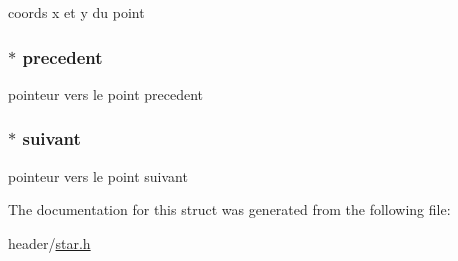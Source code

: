 coords x et y du point 

\hypertarget{struct_trajectoire_a3c1a423041539f8f86a4379cc76e00cb}{
\subsubsection[{precedent}]{$\ast$ precedent}}\label{struct_trajectoire_a3c1a423041539f8f86a4379cc76e00cb}


pointeur vers le point precedent 

\hypertarget{struct_trajectoire_a92979c948eb34c42da812423e2d758ee}{
\subsubsection[{suivant}]{$\ast$ suivant}}\label{struct_trajectoire_a92979c948eb34c42da812423e2d758ee}


pointeur vers le point suivant 



The documentation for this struct was generated from the following file\-:\begin{DoxyCompactItemize}
\item 
header/\hyperlink{star_8h}{star.\-h}\end{DoxyCompactItemize}
